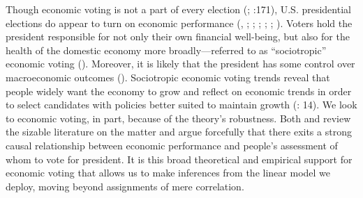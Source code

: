 \documentclass[11pt]{article}
\begin{document}
Though economic voting is not a part of every election (\citet{Stein:1990tt}; \cite{Nadeau:2001tw}:171), U.S. presidential elections do appear to turn on economic performance (\cite{miller1985throwing}, \cite{Fiorina:1978tz}; \cite{Lockerbie:1992js}; \cite{Lanoue:1994bl}; \cite{LewisBeck:2000ww}; \cite{Nadeau:2001tw}; \citet{Markus88}). Voters hold the president responsible for not only their own financial well-being, but also for the health of the domestic economy more broadly---referred to as ``sociotropic'' economic voting  (\citet{Kinder1981}). Moreover, it is likely that the president has some control over macroeconomic outcomes (\cite{blinder2014presidents}).
Sociotropic economic voting trends reveal that people widely want the economy to grow and reflect on economic trends in order to select candidates with policies better suited to maintain growth (\cite{Duch2008}: 14).
We look to economic voting, in part, because of the theory's robustness. Both \cite{Duch2008} and \cite{Revisited09} review the sizable literature on the matter and argue forcefully that there exits a strong causal relationship between economic performance and people's assessment of whom to vote for president. It is this broad theoretical and empirical support for economic voting that allows us to make inferences from the linear model we deploy, moving beyond assignments of mere correlation. %
\end{document}
